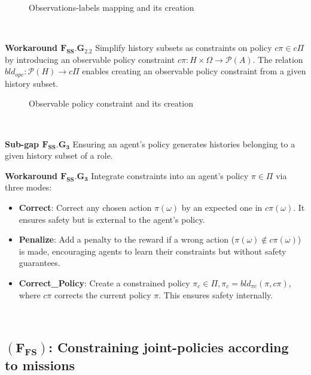 \documentclass[conference]{IEEEtran}
\newcounter{relation}
\begin{document}
\begin{figure}[h!]
    \centering
    
    \caption{Observations-labels mapping and its creation}
    \label{fig:PRAHOM_ol}
\end{figure}

\

\textbf{Workaround $\mathbf{F_{SS}.G_{2.2}}$} \quad Simplify history subsets as constraints on policy $c\pi \in c\Pi$ by introducing an observable policy constraint $c\pi: H \times \Omega \rightarrow \mathcal{P}(A)$. The relation $bld_{opc}: \mathcal{P}(H) \rightarrow c\Pi$ enables creating an observable policy constraint from a given history subset.

\begin{figure}[h!]
    \centering
    
    \caption{Observable policy constraint and its creation}
    \label{fig:PRAHOM_opc}
\end{figure}

\

\textbf{Sub-gap $\mathbf{F_{SS}.G_3}$} \quad Ensuring an agent's policy generates histories belonging to a given history subset of a role.

\textbf{Workaround $\mathbf{F_{SS}.G_3}$} \quad Integrate constraints into an agent's policy $\pi \in \Pi$ via three modes:

\begin{itemize}
    \item \textbf{Correct}: Correct any chosen action $\pi(\omega)$ by an expected one in $c\pi(\omega)$. It ensures safety but is external to the agent's policy.
    \item \textbf{Penalize}: Add a penalty to the reward if a wrong action ($\pi(\omega) \notin c\pi(\omega)$) is made, encouraging agents to learn their constraints but without safety guarantees.
    \item \textbf{Correct\_Policy}: Create a constrained policy $\pi_c \in \Pi, \pi_c = bld_{\pi c}(\pi, c\pi)$, where $c\pi$ corrects the current policy $\pi$. This ensures safety internally.
\end{itemize}

\

\subsection{\textbf{$(\mathbf{F_{FS}})$: Constraining joint-policies according to missions}}

\
\end{document}

